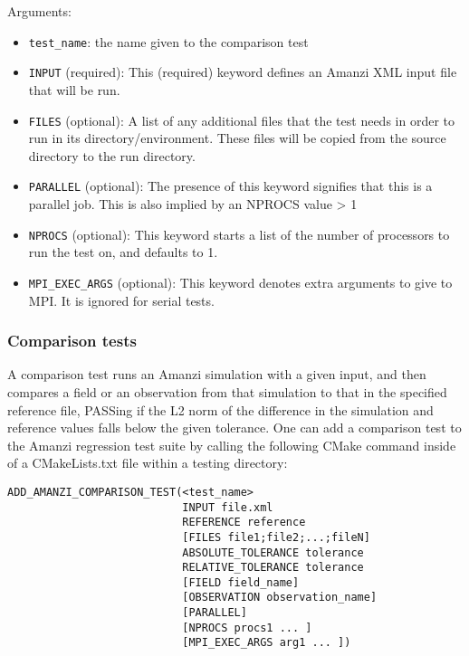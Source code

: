 Arguments:
\begin{itemize}
\item \verb|test_name|: the name given to the comparison test 
\item \verb|INPUT| (required): This (required) keyword defines an Amanzi XML input file that will 
      be run.
\item \verb|FILES| (optional): A list of any additional files that the test needs in order 
      to run in its directory/environment. These files will be copied from the source 
      directory to the run directory.
\item \verb|PARALLEL| (optional): The presence of this keyword signifies that this is 
      a parallel job. This is also implied by an NPROCS value > 1
\item \verb|NPROCS| (optional): This keyword starts a list of the number of processors to
      run the test on, and defaults to 1.
\item \verb|MPI_EXEC_ARGS| (optional): This keyword denotes extra arguments to give to
      MPI. It is ignored for serial tests.
\end{itemize}

\subsubsection{Comparison tests}

A comparison test runs an Amanzi simulation with a given input, and then compares 
a field or an observation from that simulation to that in the specified reference 
file, PASSing if the L2 norm of the difference in the simulation and reference 
values falls below the given tolerance. One can add a comparison test to the 
Amanzi regression test suite by calling the following CMake command inside of a 
CMakeLists.txt file within a testing directory:

\begin{lstlisting}
ADD_AMANZI_COMPARISON_TEST(<test_name> 
                           INPUT file.xml
                           REFERENCE reference
                           [FILES file1;file2;...;fileN]
                           ABSOLUTE_TOLERANCE tolerance
                           RELATIVE_TOLERANCE tolerance
                           [FIELD field_name]
                           [OBSERVATION observation_name]
                           [PARALLEL] 
                           [NPROCS procs1 ... ]
                           [MPI_EXEC_ARGS arg1 ... ])
\end{lstlisting}

